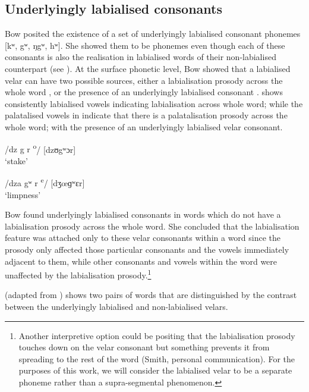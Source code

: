 \subsection{Underlyingly labialised consonants}\label{sec:2.2.2}
\hypertarget{RefHeading1210481525720847}{}
Bow posited the existence of a set of underlyingly labialised consonant phonemes [kʷ, gʷ, ŋgʷ, hʷ]. She showed them to be phonemes even though each of these consonants is also the realisation in labialised words of their non-labialised counterpart (see ). At the surface phonetic level, Bow showed that a labialised velar can have two possible sources, either a labialisation prosody across the whole word , or the presence of an underlyingly labialised consonant .  shows consistently labialised vowels indicating labialisation across whole word; while the palatalised vowels in  indicate that there is a palatalisation prosody across the whole word; with the presence of an underlyingly labialised velar consonant.


\ea \label{ex:2:24}
\textup{/dz g r \textsuperscript{o}}\textup{/ \hspace{15pt} [dzʊgʷɔr]}\\
\glt  ‘stake’ 
\z

\ea \label{ex:2:25}
\textup{/}\textup{dza gʷ r \textsuperscript{e}}\textup{/ \hspace{5pt} [dʒœɡʷɛr]}\\
\glt  ‘limpness’ 
\z

Bow found underlyingly labialised consonants in words which do not have a labialisation prosody across the whole word.  She concluded that the labialisation feature was attached only to these velar consonants within a word since the prosody only affected those particular consonants and the vowels immediately adjacent to them, while other consonants and vowels within the word were unaffected by the labialisation prosody.\footnote{Another interpretive option could be positing that the labialisation prosody touches down on the velar consonant but something prevents it from spreading to the rest of the word (Smith, personal communication). For the purposes of this work, we will consider the labialised velar to be a separate phoneme rather than a supra-segmental phenomenon.}  

 (adapted from \citealt{Bow1997c}) shows two pairs of words that are distinguished by the contrast between the underlyingly labialised and non-labialised velars.

